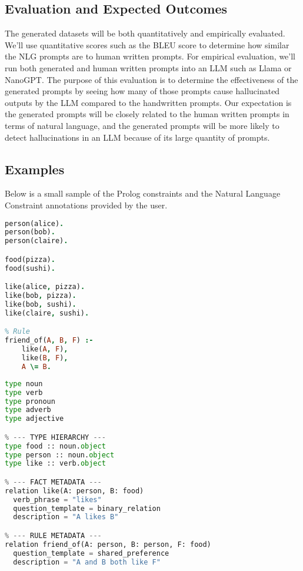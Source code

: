 \documentclass{article}
\begin{document}
\subsection{Evaluation and Expected Outcomes}
The generated datasets will be both quantitatively and empirically evaluated.  We’ll use quantitative scores such as the BLEU score to determine how similar the NLG prompts are to human written prompts.  For empirical evaluation, we’ll run both generated and human written prompts into an LLM such as Llama or NanoGPT.  The purpose of this evaluation is to determine the effectiveness of the generated prompts by seeing how many of those prompts cause hallucinated outputs by the LLM compared to the handwritten prompts.  Our expectation is the generated prompts will be closely related to the human written prompts in terms of natural language, and the generated prompts will be more likely to detect hallucinations in an LLM because of its large quantity of prompts.

\subsection{Examples}
Below is a small sample of the Prolog constraints and the Natural Language Constraint annotations provided by the user.


\noindent
\begin{minipage}{0.48\textwidth}
\begin{lstlisting}[language=Prolog]
% Facts
person(alice).
person(bob).
person(claire).

food(pizza).
food(sushi).

like(alice, pizza).
like(bob, pizza).
like(bob, sushi).
like(claire, sushi).

% Rule
friend_of(A, B, F) :-
    like(A, F),
    like(B, F),
    A \= B.
\end{lstlisting}
\end{minipage}
\hfill
\begin{minipage}{0.48\textwidth}
\begin{lstlisting}[language=Python]
% --- BUILT-INS SAMPLE ---
type noun
type verb
type pronoun
type adverb
type adjective

% --- TYPE HIERARCHY ---
type food :: noun.object
type person :: noun.object
type like :: verb.object

% --- FACT METADATA ---
relation like(A: person, B: food)
  verb_phrase = "likes"
  question_template = binary_relation
  description = "A likes B"

% --- RULE METADATA ---
relation friend_of(A: person, B: person, F: food)
  question_template = shared_preference
  description = "A and B both like F"
\end{lstlisting}
\end{minipage}
\end{document}
